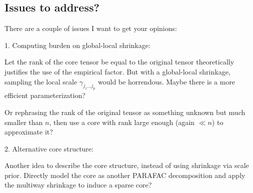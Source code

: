 \documentclass[10pt]{article}
\begin{document}
\subsection{Issues to address?}

There are a couple of issues I want to get your opinions:

1. Computing burden on global-local shrinkage:

Let the rank of the core tensor be equal to the original tensor theoretically justifies the use of the empirical factor. But with a global-local shrinkage, sampling the local scale $\gamma_{j_1\ldots j_p}$ would be horrendous. Maybe there is a more efficient parameterization?

Or rephrasing the rank of the original tensor as something unknown but much smaller than $n$, then use a core with rank large enough (again $\ll n$) to approximate it?


2. Alternative core structure:

Another idea to describe the core structure, instead of using shrinkage via scale prior. Directly model the core as another PARAFAC decomposition and apply the multiway shrinkage to induce a sparse core?
\end{document}
